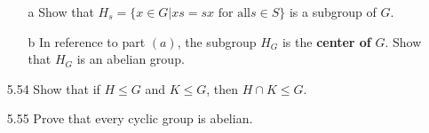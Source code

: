 \documentclass[12pt]{article}
\begin{document}
\begin{enumerate}
		\begin{enumerate}
			\item[a] Show that $H_s = \{x \in G|xs = sx \text{ for all} s \in S\}$ is a subgroup of $G$. 
			\item[b] In reference to part $(a)$, the subgroup $H_G$ is the \textbf{center of} $G$. Show that $H_G$ is an abelian group.
		\end{enumerate}
		
		\item[5.54] Show that if $H \leq G$ and $K \leq G$, then $H\cap K \leq G$.
		\item[5.55] Prove that every cyclic group is abelian.
		
	\end{enumerate}
\end{document}
